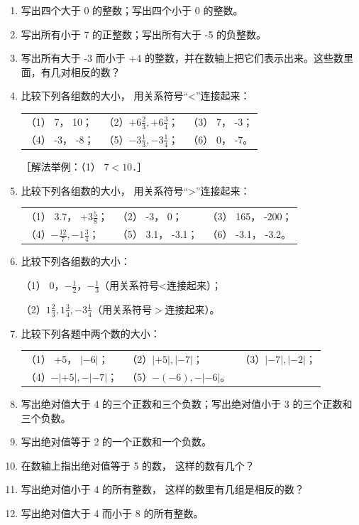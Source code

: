 \begin{enumerate}
\item
  写出四个大于 0 的整数；写出四个小于 0 的整数。
\item
  写出所有小于 7 的正整数；写出所有大于 -5 的负整数。
\item
  写出所有大于 -3 而小于 +4
  的整数，并在数轴上把它们表示出来。这些数里面，有几对相反的数？
\item
  比较下列各组数的大小， 用关系符号``\textless''连接起来：
  \par\smallskip
  \begin{tabular}{@{}lll@{}}
  （1） 7， 10； & （2）\(+6\frac{2}{3}, +6\frac{3}{4}\)； & （3） 7， -3； \\[4pt]
  （4） -3， -8； & （5）\(-3\frac{1}{3}, -3\frac{1}{4}\)； & （6） 0， -7。
  \end{tabular}
  \par\smallskip
  ［解法举例：（1） \(7 < 10\)．］
\item
  比较下列各组数的大小， 用关系符号``\textgreater''连接起来：
  \par\smallskip
  \begin{tabular}{@{}lll@{}}
  （1） 3.7， +3\(\frac{5}{8}\)； & （2） -3， 0； & （3） 165， -200； \\[4pt]
  （4）\(-\frac{12}{7}, -1\frac{3}{4}\)； & （5） 3.1， -3.1； & （6） -3.1， -3.2。
  \end{tabular}
\item
  比较下列各组数的大小：
  \par\smallskip
  （1） 0，\(-\frac{1}{2}\)，\(-\frac{1}{3}\)（用关系符号\textless 连接起来）；
  \par
  （2）\(1\frac{2}{3}, 1\frac{3}{4}, -3\frac{1}{4}\)（用关系符号\(>\)连接起来）。
\item
  比较下列各题中两个数的大小：
  \par\smallskip
  \begin{tabular}{@{}lll@{}}
  （1） +5， \(|-6|\)； & （2）\(|+5|, |-7|\)； & （3）\(|-7|, |-2|\)； \\[4pt]
  （4）\(-|+5|,-|-7|\)； & （5）\(-(-6),-|-6|\)。 &
  \end{tabular}
\item
  写出绝对值大于 4 的三个正数和三个负数；写出绝对值小于 3
  的三个正数和三个负数。
\item
  写出绝对值等于 2 的一个正数和一个负数。
\item
  在数轴上指出绝对值等于 5 的数， 这样的数有几个？
\item
  写出绝对值小于 4 的所有整数， 这样的数里有几组是相反的数？
\item
  写出绝对值大于 4 而小于 8 的所有整数。
\end{enumerate}

